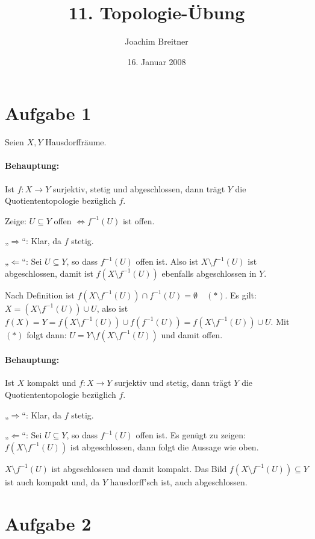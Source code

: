 \documentclass{article}
\title{11. Topologie-Übung}
\author{Joachim Breitner}
\date{16. Januar 2008}
\begin{document}
\maketitle

\section*{Aufgabe 1}

Seien $X,Y$ Hausdorffräume.

\paragraph{Behauptung:} Ist $f:X\to Y$ surjektiv, stetig und abgeschlossen, dann trägt $Y$ die Quotiententopologie bezüglich $f$.

Zeige: $U\subseteq Y$ offen $\iff f^{-1}(U)$ ist offen.

„$\Longrightarrow$“: Klar, da $f$ stetig.

„$\Longleftarrow$“: Sei $U\subseteq Y$, so dass $f^{-1}(U)$ offen ist. Also ist $X\setminus f^{-1}(U)$ ist abgeschlossen, damit ist $f(X\setminus f^{-1}(U))$ ebenfalls abgeschlossen in $Y$.

Nach Definition ist $f(X\setminus f^{-1}(U)) \cap f^{-1}(U) = \emptyset\quad (*)$. Es gilt: $X=(X\setminus f^{-1}(U)) \cup U$, also ist  $f(X) = Y = f(X\setminus f^{-1}(U)) \cup f(f^{-1}(U)) = f(X\setminus f^{-1}(U)) \cup U$. Mit $(*)$ folgt dann: $U=Y\setminus f(X\setminus f^{-1}(U))$ und damit offen.


\paragraph{Behauptung:} Ist $X$ kompakt und $f:X\to Y$ surjektiv und stetig, dann trägt $Y$ die Quotiententopologie bezüglich $f$.


„$\Longrightarrow$“: Klar, da $f$ stetig.

„$\Longleftarrow$“: Sei $U\subseteq Y$, so dass $f^{-1}(U)$ offen ist. Es genügt zu zeigen: $f(X\setminus f^{-1}(U))$ ist abgeschlossen, dann folgt die Aussage wie oben.

$X\setminus f^{-1}(U)$ ist abgeschlossen und damit kompakt. Das Bild $f(X\setminus f^{-1}(U))\subseteq Y$ ist auch kompakt und, da $Y$ hausdorff’sch ist, auch abgeschlossen.

\section*{Aufgabe 2}
\end{document}
